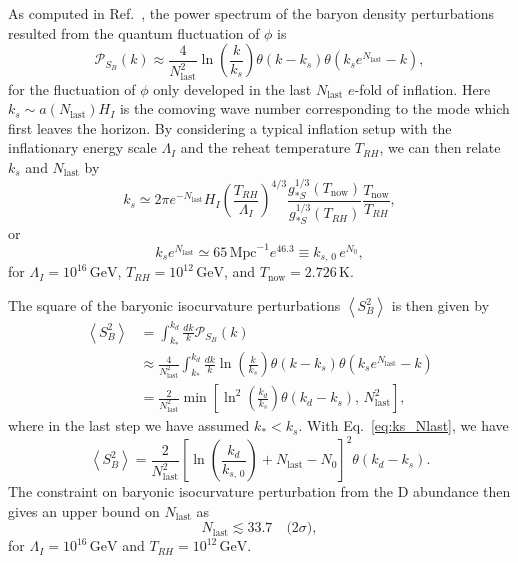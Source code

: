 \documentclass[11pt,a4paper]{article}
\begin{document}
As computed in Ref.~\cite{Kusenko:2017kdr}, the power spectrum of the baryon density perturbations resulted from the quantum fluctuation of $\phi$ is 
\begin{equation}
\mathcal{P}_{S_{B}}\left(k\right)\approx\frac{4}{N_{\mathrm{last}}^{2}}\ln\left(\frac{k}{k_{s}}\right)\theta\left(k-k_{s}\right)\theta\left(k_{s}e^{N_{\mathrm{last}}}-k\right),
\end{equation}
for the fluctuation of $\phi$ only developed in the last $N_{\mathrm{last}}$ $e$-fold of inflation. Here $k_{s}\sim a\left(N_{\mathrm{last}}\right)H_{I}$ is the comoving wave number corresponding to the mode which first leaves the horizon. By considering a typical inflation setup with the inflationary energy scale $\Lambda_{I}$ and the reheat temperature $T_{RH}$, we can then relate $k_{s}$ and $N_{\mathrm{last}}$ by 
\begin{equation}
k_{s}\simeq2\pi e^{-N_{\mathrm{last}}}H_{I}\left(\frac{T_{RH}}{\Lambda_{I}}\right)^{4/3}\frac{g_{*S}^{1/3}\left(T_{\mathrm{now}}\right)}{g_{*S}^{1/3}\left(T_{RH}\right)}\frac{T_{\mathrm{now}}}{T_{RH}},
\end{equation}
or 
\begin{equation}
k_{s}e^{N_{\mathrm{last}}}\simeq65\,\mathrm{Mpc}^{-1}e^{46.3}\equiv k_{s,\,0}\,e^{N_{0}},\label{eq:ks_Nlast}
\end{equation}
for $\Lambda_{I}=10^{16}\,\mathrm{GeV}$, $T_{RH}=10^{12}\,\mathrm{GeV}$, and $T_{\mathrm{now}}=2.726\,\mathrm{K}$.

The square of the baryonic isocurvature perturbations $\left\langle S_{B}^{2}\right\rangle $ is then given by 
\begin{align}
\left\langle S_{B}^{2}\right\rangle  & =\int_{k_{*}}^{k_{d}}\frac{dk}{k}\mathcal{P}_{S_{B}}\left(k\right)\\
 & \approx\frac{4}{N_{\mathrm{last}}^{2}}\int_{k_{*}}^{k_{d}}\frac{dk}{k}\ln\left(\frac{k}{k_{s}}\right)\theta\left(k-k_{s}\right)\theta\left(k_{s}e^{N_{\mathrm{last}}}-k\right)\\
 & =\frac{2}{N_{\mathrm{last}}^{2}}\min\left[\ln^{2}\left(\frac{k_{d}}{k_{s}}\right)\theta\left(k_{d}-k_{s}\right),\,N_{\mathrm{last}}^{2}\right],
\end{align}
where in the last step we have assumed $k_{*}<k_{s}$. With Eq.~\eqref{eq:ks_Nlast}, we have 
\begin{equation}
\left\langle S_{B}^{2}\right\rangle =\frac{2}{N_{\mathrm{last}}^{2}}\left[\ln\left(\frac{k_{d}}{k_{s,\,0}}\right)+N_{\mathrm{last}}-N_{0}\right]^{2}\theta\left(k_{d}-k_{s}\right).
\end{equation}
The constraint on baryonic isocurvature perturbation from the D abundance then gives an upper bound on $N_{\mathrm{last}}$ as 
\begin{equation}
N_{\mathrm{last}}\lesssim33.7\quad\text{(}2\sigma\text{)},
\label{eq:N_const}
\end{equation}
for $\Lambda_{I}=10^{16}\,\mathrm{GeV}$ and $T_{RH}=10^{12}\,\mathrm{GeV}$.
\end{document}
